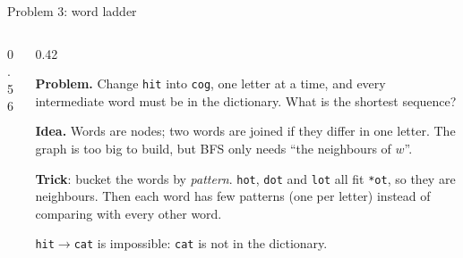 \documentclass[aspectratio=169,10pt]{beamer}
\begin{document}
\begin{frame}{Problem 3: word ladder}
\begin{columns}[T]
\begin{column}{0.56\textwidth}
\begin{sfig}[0.5]
\end{sfig}
\vspace{1mm}
\end{column}
\begin{column}{0.42\textwidth}
{\small
\textbf{Problem.} Change \texttt{hit} into \texttt{cog}, one letter at a time, and every intermediate word must be in the dictionary. What is the shortest sequence?

\vspace{2mm}
\textbf{Idea.} Words are nodes; two words are joined if they differ in one letter. The graph is too big to build, but BFS only needs ``the neighbours of $w$''.

\vspace{2mm}
\textbf{Trick}: bucket the words by \emph{pattern}. \texttt{hot}, \texttt{dot} and \texttt{lot} all fit \texttt{*ot}, so they are neighbours. Then each word has few patterns (one per letter) instead of comparing with every other word.

\vspace{2mm}
\texttt{hit}$\to$\texttt{cat} is impossible: \texttt{cat} is not in the dictionary.}
\end{column}
\end{columns}
\end{frame}
\end{document}
